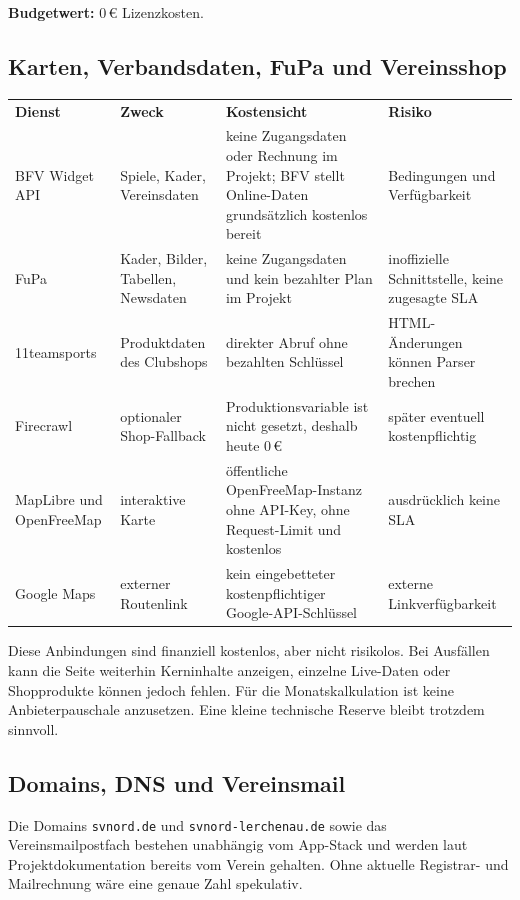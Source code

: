 \documentclass[11pt,a4paper]{article}
\newcommand{\eur}[1]{#1\,€}
\begin{document}
\textbf{Budgetwert:} \eur{0} Lizenzkosten.

\subsection{Karten, Verbandsdaten, FuPa und Vereinsshop}

\begin{tabularx}{\textwidth}{L{31mm}L{34mm}Y L{25mm}}
  \toprule
  \color{white}\sffamily\bfseries Dienst &
  \color{white}\sffamily\bfseries Zweck &
  \color{white}\sffamily\bfseries Kostensicht &
  \color{white}\sffamily\bfseries Risiko \\
  BFV Widget API & Spiele, Kader, Vereinsdaten & keine Zugangsdaten oder Rechnung im Projekt; BFV stellt Online-Daten grundsätzlich kostenlos bereit & Bedingungen und Verfügbarkeit \\
  FuPa & Kader, Bilder, Tabellen, Newsdaten & keine Zugangsdaten und kein bezahlter Plan im Projekt & inoffizielle Schnittstelle, keine zugesagte SLA \\
  11teamsports & Produktdaten des Clubshops & direkter Abruf ohne bezahlten Schlüssel & HTML-Änderungen können Parser brechen \\
  Firecrawl & optionaler Shop-Fallback & Produktionsvariable ist nicht gesetzt, deshalb heute \eur{0} & später eventuell kostenpflichtig \\
  MapLibre und OpenFreeMap & interaktive Karte & öffentliche OpenFreeMap-Instanz ohne API-Key, ohne Request-Limit und kostenlos & ausdrücklich keine SLA \\
  Google Maps & externer Routenlink & kein eingebetteter kostenpflichtiger Google-API-Schlüssel & externe Linkverfügbarkeit \\
  \bottomrule
\end{tabularx}

Diese Anbindungen sind finanziell kostenlos, aber nicht risikolos. Bei Ausfällen kann die Seite weiterhin Kerninhalte anzeigen, einzelne Live-Daten oder Shopprodukte können jedoch fehlen. Für die Monatskalkulation ist keine Anbieterpauschale anzusetzen. Eine kleine technische Reserve bleibt trotzdem sinnvoll.

\subsection{Domains, DNS und Vereinsmail}

Die Domains \texttt{svnord.de} und \texttt{svnord-lerchenau.de} sowie das Vereinsmailpostfach bestehen unabhängig vom App-Stack und werden laut Projektdokumentation bereits vom Verein gehalten. Ohne aktuelle Registrar- und Mailrechnung wäre eine genaue Zahl spekulativ.
\end{document}
